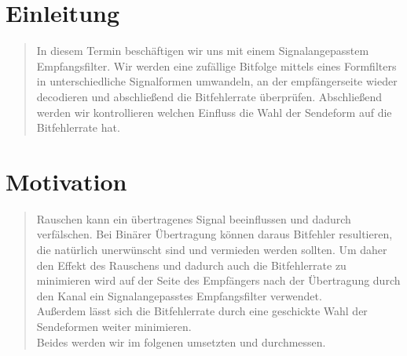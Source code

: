 \section{Einleitung}
\begin{quote}

	In diesem Termin beschäftigen wir uns mit einem Signalangepasstem Empfangsfilter. Wir werden eine zufällige Bitfolge
	mittels eines Formfilters in unterschiedliche Signalformen umwandeln, an der empfängerseite wieder decodieren und
	abschließend die Bitfehlerrate überprüfen. Abschließend werden wir kontrollieren welchen Einfluss die Wahl der
	Sendeform auf die Bitfehlerrate hat.


\end{quote}%

\section{Motivation}
\begin{quote}

	Rauschen kann ein übertragenes Signal beeinflussen und dadurch verfälschen. Bei Binärer Übertragung können daraus
	Bitfehler resultieren, die natürlich unerwünscht sind und vermieden werden sollten. Um daher den Effekt des Rauschens
	und dadurch auch die Bitfehlerrate zu minimieren wird auf der Seite des Empfängers nach der Übertragung
	durch den Kanal ein Signalangepasstes Empfangsfilter verwendet.\\
	Außerdem lässt sich die Bitfehlerrate durch eine geschickte Wahl der Sendeformen weiter minimieren.\\
	Beides werden wir im folgenen umsetzten und durchmessen. 

\end{quote} %



